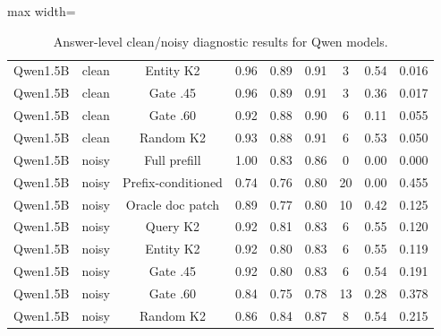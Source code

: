 \begin{table}[t]
\begin{adjustbox}{max width=\textwidth}
\begin{tabular}{ccccccccc}
Qwen1.5B & clean & Entity K2 & 0.96 & 0.89 & 0.91 & 3 & 0.54 & 0.016 \\
Qwen1.5B & clean & Gate .45 & 0.96 & 0.89 & 0.91 & 3 & 0.36 & 0.017 \\
Qwen1.5B & clean & Gate .60 & 0.92 & 0.88 & 0.90 & 6 & 0.11 & 0.055 \\
Qwen1.5B & clean & Random K2 & 0.93 & 0.88 & 0.91 & 6 & 0.53 & 0.050 \\
Qwen1.5B & noisy & Full prefill & 1.00 & 0.83 & 0.86 & 0 & 0.00 & 0.000 \\
Qwen1.5B & noisy & Prefix-conditioned & 0.74 & 0.76 & 0.80 & 20 & 0.00 & 0.455 \\
Qwen1.5B & noisy & Oracle doc patch & 0.89 & 0.77 & 0.80 & 10 & 0.42 & 0.125 \\
Qwen1.5B & noisy & Query K2 & 0.92 & 0.81 & 0.83 & 6 & 0.55 & 0.120 \\
Qwen1.5B & noisy & Entity K2 & 0.92 & 0.80 & 0.83 & 6 & 0.55 & 0.119 \\
Qwen1.5B & noisy & Gate .45 & 0.92 & 0.80 & 0.83 & 6 & 0.54 & 0.191 \\
Qwen1.5B & noisy & Gate .60 & 0.84 & 0.75 & 0.78 & 13 & 0.28 & 0.378 \\
Qwen1.5B & noisy & Random K2 & 0.86 & 0.84 & 0.87 & 8 & 0.54 & 0.215 \\
\bottomrule
\end{tabular}
\end{adjustbox}
\caption{Answer-level clean/noisy diagnostic results for Qwen models.}
\label{tab:synthetic}\end{table}
